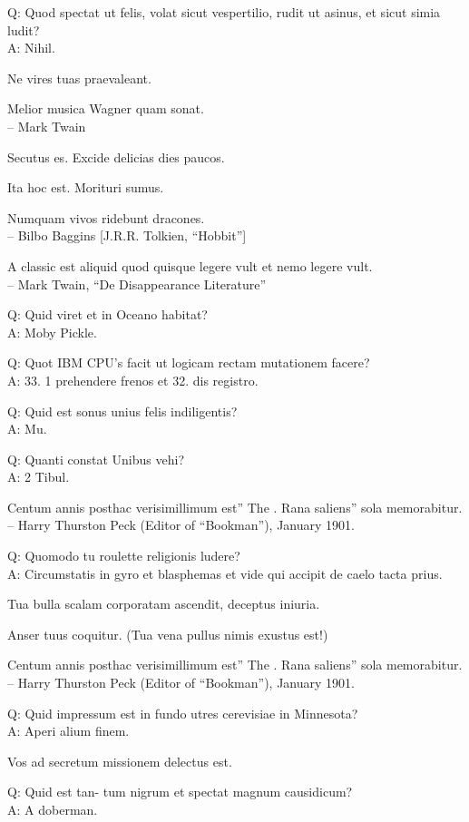 \documentclass[titlepage,12pt]{memoir}
\begin{document}
Q: Quod spectat ut felis, volat sicut vespertilio, rudit ut asinus, et
sicut simia ludit?\\
A: Nihil.

Ne vires tuas praevaleant.

Melior musica Wagner quam sonat.
\\-- Mark Twain

Secutus es. Excide delicias dies paucos.

Ita hoc est. Morituri sumus.

Numquam vivos ridebunt dracones.
\\-- Bilbo Baggins [J.R.R. Tolkien, “Hobbit”]

A classic est aliquid quod quisque legere vult
et nemo legere vult.
\\-- Mark Twain, “De Disappearance Literature”

Q: Quid viret et in Oceano habitat?\\
A: Moby Pickle.

Q: Quot IBM CPU’s facit ut logicam rectam mutationem facere?\\
A: 33. 1 prehendere frenos et 32. dis registro.

Q: Quid est sonus unius felis indiligentis?\\
A: Mu.

Q: Quanti constat Unibus vehi?\\
A: 2 Tibul.

Centum annis posthac verisimillimum est” The .
Rana saliens” sola memorabitur.
\\-- Harry Thurston Peck (Editor of “Bookman”), January 1901.

Q: Quomodo tu roulette religionis ludere?\\
A: Circumstatis in gyro et blasphemas et vide qui accipit
de caelo tacta prius.

Tua bulla scalam corporatam ascendit, deceptus iniuria.

Anser tuus coquitur.
(Tua vena pullus nimis exustus est!)

Centum annis posthac verisimillimum est” The .
Rana saliens” sola memorabitur.
\\-- Harry Thurston Peck (Editor of “Bookman”), January 1901.

Q: Quid impressum est in fundo utres cerevisiae in Minnesota?\\
A: Aperi alium finem.

Vos ad secretum missionem delectus est.

Q: Quid est tan- tum nigrum et spectat magnum causidicum?\\
A: A doberman.
\end{document}
